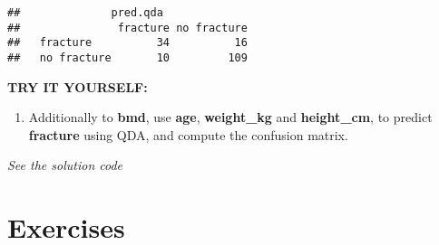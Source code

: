 \documentclass[
]{book}
\newenvironment{Shaded}{\begin{snugshade}}{\end{snugshade}}
\newcommand{\AttributeTok}[1]{\textcolor[rgb]{0.13,0.29,0.53}{#1}}
\newcommand{\CommentTok}[1]{\textcolor[rgb]{0.56,0.35,0.01}{\textit{#1}}}
\newcommand{\FunctionTok}[1]{\textcolor[rgb]{0.13,0.29,0.53}{\textbf{#1}}}
\newcommand{\NormalTok}[1]{#1}
\newcommand{\OtherTok}[1]{\textcolor[rgb]{0.56,0.35,0.01}{#1}}
\newcommand{\SpecialCharTok}[1]{\textcolor[rgb]{0.81,0.36,0.00}{\textbf{#1}}}
\providecommand{\tightlist}{%
  \setlength{\itemsep}{0pt}\setlength{\parskip}{0pt}}
\begin{document}
\begin{verbatim}
##              pred.qda
##               fracture no fracture
##   fracture          34          16
##   no fracture       10         109
\end{verbatim}

\textbf{TRY IT YOURSELF:}

\begin{enumerate}
\def\labelenumi{\arabic{enumi})}
\tightlist
\item
  Additionally to \textbf{bmd}, use \textbf{age}, \textbf{weight\_kg} and \textbf{height\_cm}, to
  predict \textbf{fracture} using QDA, and compute the confusion matrix.
\end{enumerate}

\emph{See the solution code}

\begin{Shaded}
\end{Shaded}

\section{Exercises}\label{lda.exerc}
\end{document}
